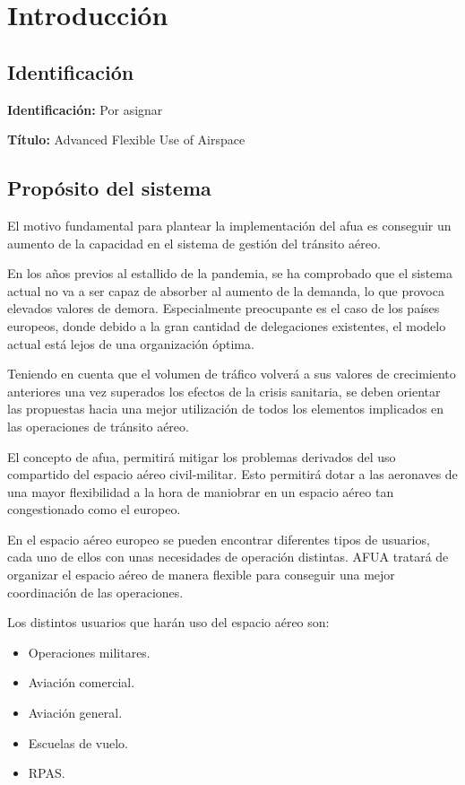 \chapter{Introducción}

\section{Identificación}

\textbf{Identificación:} Por asignar

\textbf{Título:} Advanced Flexible Use of Airspace 

\section{Propósito del sistema}

El motivo fundamental para plantear la implementación del \acrfull{afua} es conseguir un aumento de la capacidad en el sistema de gestión del tránsito aéreo. 

En los años previos al estallido de la pandemia, se ha comprobado que el sistema actual no va a ser capaz de absorber al aumento de la demanda, lo que provoca elevados valores de demora. Especialmente preocupante es el caso de los países europeos, donde debido a la gran cantidad de delegaciones existentes, el modelo actual está lejos de una organización óptima. 

Teniendo en cuenta que el volumen de tráfico volverá a sus valores de crecimiento anteriores una vez superados los efectos de la crisis sanitaria, se deben orientar las propuestas hacia una mejor utilización de todos los elementos implicados en las operaciones de tránsito aéreo. 

El concepto de \acrlong{afua}, permitirá mitigar los problemas derivados del uso compartido del espacio aéreo civil-militar. Esto permitirá dotar a las aeronaves de una mayor flexibilidad a la hora de maniobrar en un espacio aéreo tan congestionado como el europeo. 

En el espacio aéreo europeo se pueden encontrar diferentes tipos de usuarios, cada uno de ellos con unas necesidades de operación distintas. AFUA tratará de organizar el espacio aéreo de manera flexible para conseguir una mejor coordinación de las operaciones.

Los distintos usuarios que harán uso del espacio aéreo son:

\begin{itemize}
    \item Operaciones militares.
    \item Aviación comercial.
    \item Aviación general.
    \item Escuelas de vuelo.
    \item RPAS.
\end{itemize}

